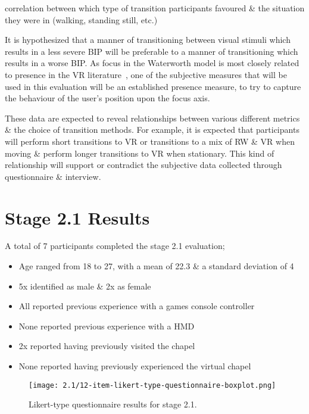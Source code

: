 correlation between which type of transition participants favoured \& the situation they were in (walking, standing still, etc.)

It is hypothesized that a manner of transitioning between visual stimuli which results in a less severe BIP will be preferable to a manner of transitioning which results in a worse BIP. As focus in the Waterworth model is most closely related to presence in the VR literature~\cite{Waterworth2001}, one of the subjective measures that will be used in this evaluation will be an established presence measure, to try to capture the behaviour of the user's position upon the focus axis.

These data are expected to reveal relationships between various different metrics \& the choice of transition methods. For example, it is expected that participants will perform short transitions to VR or transitions to a mix of RW \& VR when moving \& perform longer transitions to VR when stationary. This kind of relationship will support or contradict the subjective data collected through questionnaire \& interview.


\section{Stage 2.1 Results}

A total of 7 participants completed the stage 2.1 evaluation;
\begin{itemize}
	\item Age ranged from 18 to 27, with a mean of 22.3 \& a standard deviation of 4
	\item 5x identified as male \& 2x as female
	\item All reported previous experience with a games console controller
	\item None reported previous experience with a HMD
	\item 2x reported having previously visited the chapel
	\item None reported having previously experienced the virtual chapel
\end{itemize}


\begin{figure}[h]
	\begin{center}
	\texttt{[image: 2.1/12-item-likert-type-questionnaire-boxplot.png]}
	\caption{Likert-type questionnaire results for stage 2.1.}
	\label{2-1-12-item-likert-type-questionnaire-boxplot.png}
	\end{center}
\end{figure}

